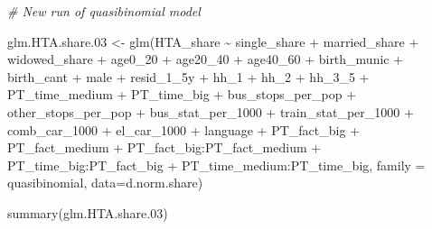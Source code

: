 \documentclass[
]{article}
\newenvironment{Shaded}{\begin{snugshade}}{\end{snugshade}}
\newcommand{\AttributeTok}[1]{\textcolor[rgb]{0.77,0.63,0.00}{#1}}
\newcommand{\CommentTok}[1]{\textcolor[rgb]{0.56,0.35,0.01}{\textit{#1}}}
\newcommand{\FloatTok}[1]{\textcolor[rgb]{0.00,0.00,0.81}{#1}}
\newcommand{\FunctionTok}[1]{\textcolor[rgb]{0.00,0.00,0.00}{#1}}
\newcommand{\NormalTok}[1]{#1}
\newcommand{\OtherTok}[1]{\textcolor[rgb]{0.56,0.35,0.01}{#1}}
\newcommand{\SpecialCharTok}[1]{\textcolor[rgb]{0.00,0.00,0.00}{#1}}
\begin{document}
\begin{Shaded}
\begin{Highlighting}[]
\CommentTok{\# New run of quasibinomial model}

\NormalTok{glm.HTA.share}\FloatTok{.03} \OtherTok{\textless{}{-}} \FunctionTok{glm}\NormalTok{(HTA\_share }\SpecialCharTok{\textasciitilde{}}\NormalTok{ single\_share }\SpecialCharTok{+}\NormalTok{ married\_share }\SpecialCharTok{+}\NormalTok{ widowed\_share }\SpecialCharTok{+} 
\NormalTok{      age0\_20 }\SpecialCharTok{+}\NormalTok{ age20\_40 }\SpecialCharTok{+}\NormalTok{ age40\_60 }\SpecialCharTok{+}\NormalTok{ birth\_munic }\SpecialCharTok{+}\NormalTok{ birth\_cant }\SpecialCharTok{+}\NormalTok{ male }\SpecialCharTok{+}\NormalTok{ resid\_1\_5y }\SpecialCharTok{+} 
\NormalTok{      hh\_1 }\SpecialCharTok{+}\NormalTok{ hh\_2 }\SpecialCharTok{+}\NormalTok{ hh\_3\_5 }\SpecialCharTok{+}\NormalTok{ PT\_time\_medium }\SpecialCharTok{+}\NormalTok{ PT\_time\_big }\SpecialCharTok{+}\NormalTok{ bus\_stops\_per\_pop }\SpecialCharTok{+} 
\NormalTok{      other\_stops\_per\_pop }\SpecialCharTok{+}\NormalTok{ bus\_stat\_per\_1000 }\SpecialCharTok{+}\NormalTok{ train\_stat\_per\_1000 }\SpecialCharTok{+}\NormalTok{ comb\_car\_1000 }\SpecialCharTok{+}
\NormalTok{      el\_car\_1000 }\SpecialCharTok{+}\NormalTok{ language }\SpecialCharTok{+}\NormalTok{ PT\_fact\_big }\SpecialCharTok{+}\NormalTok{ PT\_fact\_medium }\SpecialCharTok{+}\NormalTok{ PT\_fact\_big}\SpecialCharTok{:}\NormalTok{PT\_fact\_medium }\SpecialCharTok{+} 
\NormalTok{      PT\_time\_big}\SpecialCharTok{:}\NormalTok{PT\_fact\_big }\SpecialCharTok{+}\NormalTok{ PT\_time\_medium}\SpecialCharTok{:}\NormalTok{PT\_time\_big, }
      \AttributeTok{family =}\NormalTok{ quasibinomial, }\AttributeTok{data=}\NormalTok{d.norm.share)}

\FunctionTok{summary}\NormalTok{(glm.HTA.share}\FloatTok{.03}\NormalTok{)}
\end{Highlighting}
\end{Shaded}
\end{document}
